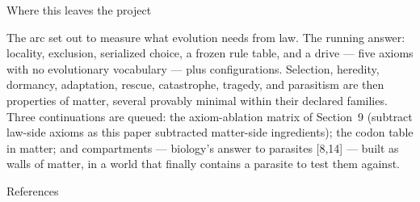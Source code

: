 \sec Where this leaves the project

The arc set out to measure what evolution needs from law. The
running answer: locality, exclusion, serialized choice, a frozen
rule table, and a drive --- five axioms with no evolutionary
vocabulary --- plus configurations. Selection, heredity, dormancy,
adaptation, rescue, catastrophe, tragedy, and parasitism are then
properties of matter, several provably minimal within their
declared families. Three continuations are queued: the
axiom-ablation matrix of Section~9 (subtract law-side axioms as
this paper subtracted matter-side ingredients); the codon table in
matter; and compartments --- biology's answer to parasites [8,14]
--- built as walls of matter, in a world that finally contains a
parasite to test them against.

\sec References

